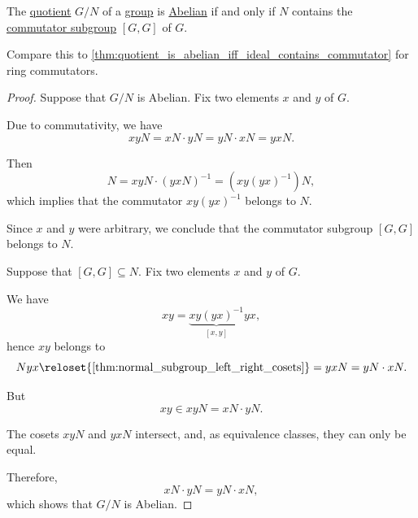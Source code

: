 \begin{proposition}\label{thm:quotient_is_abelian_iff_subgroup_contains_commutator}
  The \hyperref[def:group/quotient]{quotient} \( G / N \) of a \hyperref[def:group]{group} is \hyperref[def:abelian_group]{Abelian} if and only if \( N \) contains the \hyperref[def:group_commutator]{commutator subgroup} \( [G, G] \) of \( G \).
\end{proposition}
\begin{comments}
  \item Compare this to \cref{thm:quotient_is_abelian_iff_ideal_contains_commutator} for ring commutators.
\end{comments}
\begin{proof}
  \SufficiencySubProof Suppose that \( G / N \) is Abelian. Fix two elements \( x \) and \( y \) of \( G \).

  Due to commutativity, we have
  \begin{equation*}
    xyN = xN \cdot yN = yN \cdot xN = yxN.
  \end{equation*}

  Then
  \begin{equation*}
    N = xyN \cdot (yxN)^{-1} = (xy(yx)^{-1})N,
  \end{equation*}
  which implies that the commutator \( xy(yx)^{-1} \) belongs to \( N \).

  Since \( x \) and \( y \) were arbitrary, we conclude that the commutator subgroup \( [G, G] \) belongs to \( N \).

  \NecessitySubProof Suppose that \( [G, G] \subseteq N \). Fix two elements \( x \) and \( y \) of \( G \).

  We have
  \begin{equation*}
    xy = \underbrace{xy (yx)^{-1}}_{[x, y]} yx,
  \end{equation*}
  hence \( xy \) belongs to
  \begin{equation*}
    Nyx
    \reloset {\ref{thm:normal_subgroup_left_right_cosets}} =
    yxN
    =
    yN \cdot xN.
  \end{equation*}

  But
  \begin{equation*}
    xy \in xyN = xN \cdot yN.
  \end{equation*}

  The cosets \( xyN \) and \( yxN \) intersect, and, as equivalence classes, they can only be equal.

  Therefore,
  \begin{equation*}
    xN \cdot yN = yN \cdot xN,
  \end{equation*}
  which shows that \( G / N \) is Abelian.
\end{proof}

